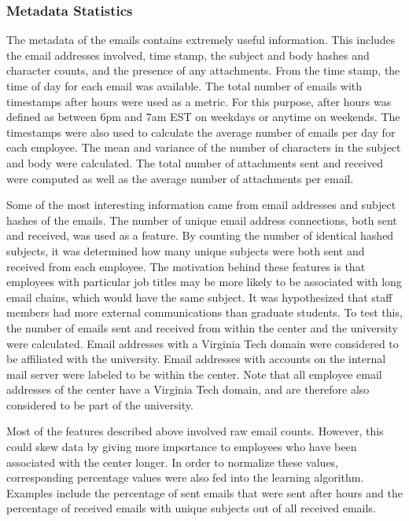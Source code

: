 \documentclass[12pt]{report}
\begin{document}
\subsubsection{Metadata Statistics}
The metadata of the emails contains extremely useful information.  This includes the email addresses involved, time stamp, the subject and body hashes and character counts, and the presence of any attachments.
From the time stamp, the time of day for each email was available.
The total number of emails with timestamps after hours were used as a metric.
For this purpose, after hours was defined as between 6pm and 7am EST on weekdays or anytime on weekends.
The timestamps were also used to calculate the average number of emails per day for each employee.
The mean and variance of the number of characters in the subject and body were calculated.
The total number of attachments sent and received were computed as well as the average number of attachments per email.

Some of the most interesting information came from email addresses and subject hashes of the emails.
The number of unique email address connections, both sent and received, was used as a feature.
By counting the number of identical hashed subjects, it was determined how many unique subjects were both sent and received from each employee.
The motivation behind these features is that employees with particular job titles may be more likely to be associated with long email chains, which would have the same subject.
It was hypothesized that staff members had more external communications than graduate students.
To test this, the number of emails sent and received from within the center and the university were calculated.
Email addresses with a Virginia Tech domain were considered to be affiliated with the university.
Email addresses with accounts on the internal mail server were labeled to be within the center.
Note that all employee email addresses of the center have a Virginia Tech domain, and are therefore also considered to be part of the university.


Most of the features described above involved raw email counts.
However, this could skew data by giving more importance to employees who have been associated with the center longer.
In order to normalize these values, corresponding percentage values were also fed into the learning algorithm.
Examples include the percentage of  sent emails that were sent after hours and the percentage of received emails with unique subjects out of all received emails.
\end{document}
